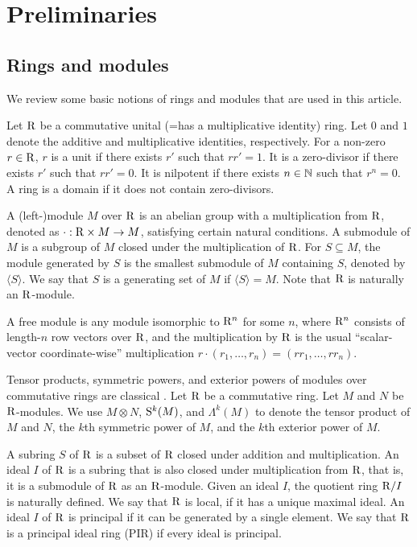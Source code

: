 \section{Preliminaries}

\subsection{Rings and modules}

We review some basic notions of rings and modules that are used in this article. 

Let $\rng$ be a commutative unital (=has a multiplicative identity) ring. Let $0$ and $1$ denote the additive and multiplicative identities, respectively. For a non-zero $r\in \rng$, $r$ is a unit if there exists $r'$ such that $rr'=1$. It is a zero-divisor if there exists $r'$ such that $rr'=0$. It is nilpotent if there exists $n\in \N$ such that $r^n=0$. A ring is a domain if it does not contain zero-divisors.


A (left-)module $M$ over $\rng$ is an abelian group with a multiplication from $\rng$, denoted as $\cdot:\rng\times M\to M$, satisfying certain natural conditions. A submodule of $M$ is a subgroup of $M$ closed under the multiplication of $\rng$. For $S\subseteq M$, the module generated by $S$ is the smallest submodule of $M$ containing $S$, denoted by $\langle S\rangle$. We say that $S$ is a generating set of $M$ if $\langle S\rangle=M$. Note that $\rng$ is naturally an $\rng$-module.

A free module is any module isomorphic to $\rng^n$ for some $n$, where $\rng^n$ consists of length-$n$ row vectors over $\rng$, and the multiplication by $\rng$ is the usual ``scalar-vector coordinate-wise'' multiplication $r \cdot (r_1, \dotsc, r_n) = (rr_1, \dotsc, rr_n)$. 

Tensor products, symmetric powers, and exterior powers of modules over commutative rings are classical \cite{AM94}. Let $\rng$ be a commutative ring. Let $M$ and $N$ be $\rng$-modules. We use $M\otimes N$, $\S^k(M)$, and $\Lambda^k(M)$ to denote the tensor product of $M$ and $N$, the $k$th symmetric power of $M$, and the $k$th exterior power of $M$.

A subring $S$ of $\rng$ is a subset of $\rng$ closed under addition and multiplication. An ideal $I$ of $\rng$ is a subring that is also closed under multiplication from $\rng$, that is, it is a submodule of $\rng$ as an $\rng$-module. Given an ideal $I$, the quotient ring $\rng/I$ is naturally defined. We say that $\rng$ is local, if it has a unique maximal ideal. An ideal $I$ of $\rng$ is principal if it can be generated by a single element. We say that $\rng$ is a principal ideal ring (PIR) if every ideal is principal. 

